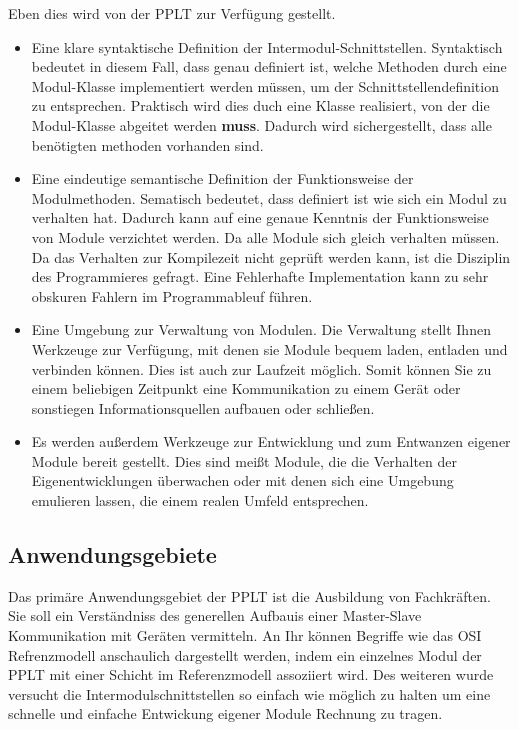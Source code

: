 \documentclass[a4paper,10pt]{book}
\begin{document}
    Eben dies wird von der PPLT zur Verfügung gestellt. 
    \begin{itemize}
    \item Eine klare syntaktische Definition der Intermodul-Schnittstellen. 
        Syntaktisch bedeutet in diesem Fall, dass genau definiert ist, welche
        Methoden durch eine Modul-Klasse implementiert werden müssen, um der 
        Schnittstellendefinition zu entsprechen. Praktisch wird dies duch eine
        Klasse realisiert, von der die Modul-Klasse abgeitet werden \textbf{muss}.
        Dadurch wird sichergestellt, dass alle benötigten methoden vorhanden 
        sind.
    \item Eine eindeutige semantische Definition der Funktionsweise der
        Modulmethoden. Sematisch bedeutet, dass definiert ist wie sich
        ein Modul zu verhalten hat. Dadurch kann auf eine genaue Kenntnis
        der Funktionsweise von Module verzichtet werden. Da alle Module sich
        gleich verhalten müssen. Da das Verhalten zur Kompilezeit nicht 
        geprüft werden kann, ist die Disziplin des Programmieres gefragt.
        Eine Fehlerhafte Implementation kann zu sehr obskuren Fahlern im
        Programmableuf führen.              
    \item Eine Umgebung zur Verwaltung von Modulen. Die Verwaltung stellt
        Ihnen Werkzeuge zur Verfügung, mit denen sie Module bequem laden,
        entladen und verbinden können.  Dies ist auch zur Laufzeit möglich.
        Somit können Sie zu einem beliebigen Zeitpunkt eine Kommunikation
        zu einem Gerät oder sonstiegen Informationsquellen aufbauen oder 
        schließen.
    \item Es werden außerdem Werkzeuge zur Entwicklung und zum Entwanzen
        eigener Module bereit gestellt. Dies sind meißt Module, die 
        die Verhalten der Eigenentwicklungen überwachen oder mit denen
        sich eine Umgebung emulieren lassen, die einem realen Umfeld 
        entsprechen.
    \end{itemize}
    
    
    \subsection{Anwendungsgebiete}
    Das primäre Anwendungsgebiet der PPLT ist die Ausbildung von Fachkräften.
    Sie soll ein Verständniss des generellen Aufbauis einer Master-Slave 
    Kommunikation mit Geräten vermitteln. An Ihr können Begriffe wie das OSI 
    Refrenzmodell anschaulich dargestellt werden, indem ein einzelnes Modul 
    der PPLT mit einer Schicht im Referenzmodell assoziiert wird. Des weiteren 
    wurde versucht die Intermodulschnittstellen so einfach wie möglich zu 
    halten um eine schnelle und einfache Entwickung eigener Module Rechnung zu 
    tragen. 
   
\end{document}
